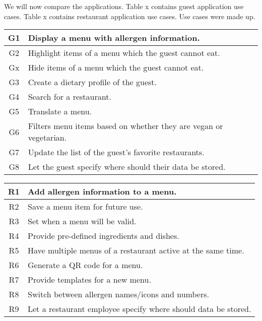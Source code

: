 We will now compare the applications.
Table x contains guest application use cases.
Table x contains restaurant application use cases.
Use cases were made up.

\begin{center}
  \begin{tabular}{| c | l |}
    \hline
    G1 & Display a menu with allergen information. &  \\
    \hline
    G2 & Highlight items of a menu which the guest cannot eat. &  \\
    \hline
    Gx & Hide items of a menu which the guest cannot eat. &  \\
    \hline
    G3 & Create a dietary profile of the guest. &  \\
    \hline
    G4 & Search for a restaurant. \\
    \hline
    G5 & Translate a menu. &  \\
    \hline
    G6 & Filters menu items based on whether they are vegan or vegetarian. &  \\
    \hline
    G7 & Update the list of the guest's favorite restaurants. &  \\
    \hline
    G8 & Let the guest specify where should their data be stored. & \\ 
    \hline
  \end{tabular}
  \newline
\end{center}

\begin{center}
  \begin{tabular}{| c | l |}
    \hline
    R1 & Add allergen information to a menu. \\
    \hline
    R2 & Save a menu item for future use. \\
    \hline
    R3 & Set when a menu will be valid. \\
    \hline
    R4 & Provide pre-defined ingredients and dishes. \\
    \hline
    R5 & Have multiple menus of a restaurant active at the same time. \\    
    \hline
    R6 & Generate a QR code for a menu. \\
    \hline 
    R7 & Provide templates for a new menu. \\
    \hline 
    R8 & Switch between allergen names/icons and numbers. \\
    \hline 
    R9 & Let a restaurant employee specify where should data be stored. \\
    \hline
  \end{tabular}
  \newline
\end{center}

